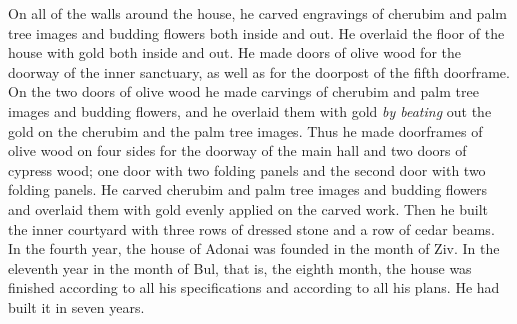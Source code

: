 \begin{biblechapter}
\verse On all of the walls around the house, he carved engravings of cherubim and palm tree images and budding flowers both inside and out.
\verse He overlaid the floor of the house with gold both inside and out.
\verse He made doors of olive wood for the doorway of the inner sanctuary, as well as for the doorpost of the fifth doorframe.
\verse On the two doors of olive wood he made carvings of cherubim and palm tree images and budding flowers, and he overlaid them with gold \textit{by beating} out the gold on the cherubim and the palm tree images.
\verse Thus he made doorframes of olive wood on four sides for the doorway of the main hall
\verse and two doors of cypress wood; one door with two folding panels and the second door with two folding panels.
\verse He carved cherubim and palm tree images and budding flowers and overlaid them with gold evenly applied on the carved work.
\verse Then he built the inner courtyard with three rows of dressed stone and a row of cedar beams.
\verse In the fourth year, the house of Adonai was founded in the month of Ziv.
\verse In the eleventh year in the month of Bul, that is, the eighth month, the house was finished according to all his specifications and according to all his plans. He had built it in seven years.
\end{biblechapter}

